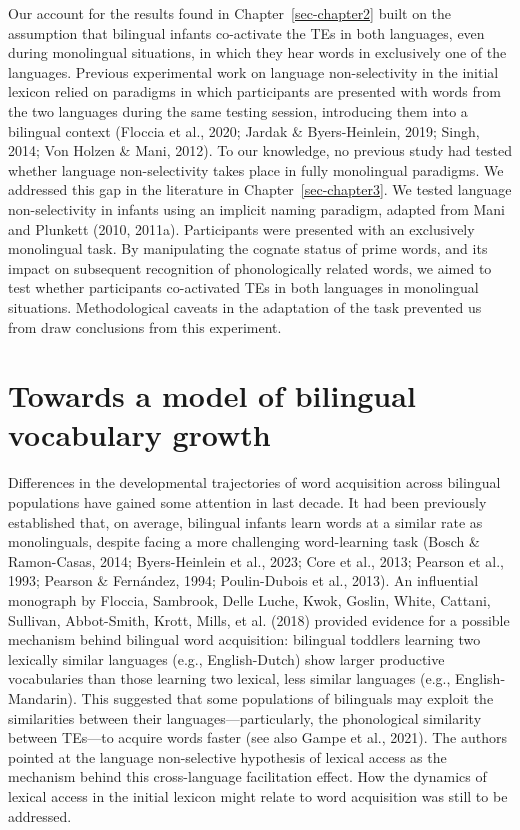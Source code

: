 \documentclass[
  12pt,
  b5paperpaper,
  twoside]{scrreprt}
\begin{document}
Our account for the results found in Chapter~\ref{sec-chapter2} built on
the assumption that bilingual infants co-activate the TEs in both
languages, even during monolingual situations, in which they hear words
in exclusively one of the languages. Previous experimental work on
language non-selectivity in the initial lexicon relied on paradigms in
which participants are presented with words from the two languages
during the same testing session, introducing them into a bilingual
context (Floccia et al., 2020; Jardak \& Byers-Heinlein, 2019; Singh,
2014; Von Holzen \& Mani, 2012). To our knowledge, no previous study had
tested whether language non-selectivity takes place in fully monolingual
paradigms. We addressed this gap in the literature in
Chapter~\ref{sec-chapter3}. We tested language non-selectivity in
infants using an implicit naming paradigm, adapted from Mani and
Plunkett (2010, 2011a). Participants were presented with an exclusively
monolingual task. By manipulating the cognate status of prime words, and
its impact on subsequent recognition of phonologically related words, we
aimed to test whether participants co-activated TEs in both languages in
monolingual situations. Methodological caveats in the adaptation of the
task prevented us from draw conclusions from this experiment.

\hypertarget{towards-a-model-of-bilingual-vocabulary-growth}{%
\section{Towards a model of bilingual vocabulary
growth}\label{towards-a-model-of-bilingual-vocabulary-growth}}

Differences in the developmental trajectories of word acquisition across
bilingual populations have gained some attention in last decade. It had
been previously established that, on average, bilingual infants learn
words at a similar rate as monolinguals, despite facing a more
challenging word-learning task (Bosch \& Ramon-Casas, 2014;
Byers-Heinlein et al., 2023; Core et al., 2013; Pearson et al., 1993;
Pearson \& Fernández, 1994; Poulin-Dubois et al., 2013). An influential
monograph by Floccia, Sambrook, Delle Luche, Kwok, Goslin, White,
Cattani, Sullivan, Abbot-Smith, Krott, Mills, et al. (2018) provided
evidence for a possible mechanism behind bilingual word acquisition:
bilingual toddlers learning two lexically similar languages (e.g.,
English-Dutch) show larger productive vocabularies than those learning
two lexical, less similar languages (e.g., English-Mandarin). This
suggested that some populations of bilinguals may exploit the
similarities between their languages---particularly, the phonological
similarity between TEs---to acquire words faster (see also Gampe et al.,
2021). The authors pointed at the language non-selective hypothesis of
lexical access as the mechanism behind this cross-language facilitation
effect. How the dynamics of lexical access in the initial lexicon might
relate to word acquisition was still to be addressed.
\end{document}
